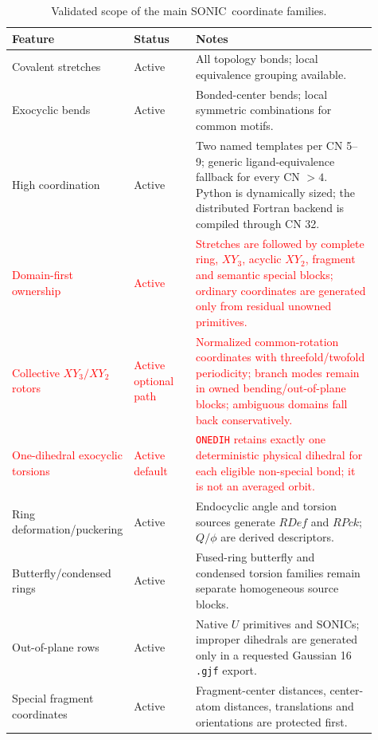 \documentclass[journal=jctcce,manuscript=article,layout=traditional]{achemso}
\newcommand{\SONIC}{SONIC}
\theoremstyle{definition}
\begin{document}
\begin{table}[p]
\centering
\scriptsize
\setlength{\tabcolsep}{2.6pt}
\renewcommand{\arraystretch}{0.88}
\caption{Validated scope of the main \SONIC\ coordinate families.}
\label{tab:status}
\begin{tabular}{@{}p{0.24\linewidth}p{0.17\linewidth}p{0.50\linewidth}@{}}
\toprule
Feature & Status & Notes \\
\midrule
Covalent stretches & Active & All topology bonds; local equivalence grouping available. \\
\midrule
Exocyclic bends & Active & Bonded-center bends; local symmetric combinations for common motifs. \\
\midrule
High coordination & Active & Two named templates per CN 5--9; generic ligand-equivalence fallback for every CN $>4$. Python is dynamically sized; the distributed Fortran backend is compiled through CN 32. \\
\midrule
\textcolor{red}{Domain-first ownership} & \textcolor{red}{Active} &
\textcolor{red}{Stretches are followed by complete ring, \(XY_3\), acyclic
\(XY_2\), fragment and semantic special blocks; ordinary coordinates are
generated only from residual unowned primitives.} \\
\midrule
\textcolor{red}{Collective \(XY_3/XY_2\) rotors} &
\textcolor{red}{Active optional path} &
\textcolor{red}{Normalized common-rotation coordinates with
threefold/twofold periodicity; branch modes remain in owned bending/out-of-plane
blocks; ambiguous domains fall back conservatively.} \\
\midrule
\textcolor{red}{One-dihedral exocyclic torsions} &
\textcolor{red}{Active default} &
\textcolor{red}{\texttt{ONEDIH} retains exactly one deterministic physical
dihedral for each eligible non-special bond; it is not an averaged orbit.} \\
\midrule
Ring deformation/puckering & Active & Endocyclic angle and torsion sources generate \(RDef\) and \(RPck\); \(Q/\phi\) are derived descriptors. \\
\midrule
Butterfly/condensed rings & Active & Fused-ring butterfly and condensed torsion families remain separate homogeneous source blocks. \\
\midrule
Out-of-plane rows & Active & Native \(U\) primitives and SONICs; improper dihedrals are generated only in a requested Gaussian 16 \texttt{.gjf} export. \\
\midrule
Special fragment coordinates & Active & Fragment-center distances, center-atom distances, translations and orientations are protected first. \\

\end{tabular}
\end{table}
\end{document}
